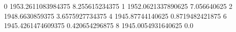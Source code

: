 0 1953.2611083984375 8.255615234375
1 1952.0621337890625 7.056640625
2 1948.6630859375 3.6575927734375
4 1945.87744140625 0.8719482421875
6 1945.4261474609375 0.420654296875
8 1945.0054931640625 0.0
